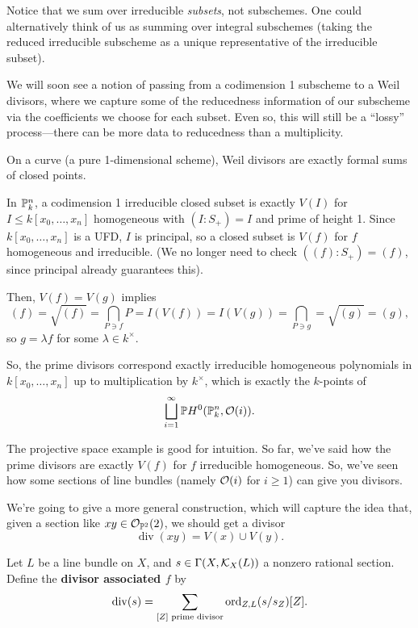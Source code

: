 \documentclass[12pt]{article}
\renewcommand{\div}{\operatorname{div}}
\begin{document}
Notice that we sum over irreducible \textit{subsets}, not subschemes. One could alternatively think of us as summing over integral subschemes (taking the reduced irreducible subscheme as a unique representative of the irreducible subset).

We will soon see a notion of passing from a codimension 1 subscheme to a Weil divisors, where we capture some of the reducedness information  of our subscheme via the coefficients we choose for each subset. Even so, this will still be a ``lossy'' process---there can be more data to reducedness than a multiplicity.

\begin{eg}
    On a curve (a pure 1-dimensional scheme), Weil divisors are exactly formal sums of closed points.
\end{eg}

\begin{eg}
    In $\P_k^n$, a codimension 1 irreducible closed subset is exactly $V(I)$ for $I\leq k[x_0,\dots,x_n]$ homogeneous with $(I:S_+)=I$ and prime of height 1. Since $k[x_0,\dots,x_n]$ is a UFD, $I$ is principal, so a closed subset is $V(f)$ for $f$ homogeneous and irreducible. (We no longer need to check $((f): S_+)=(f)$, since principal already guarantees this).

    Then, $V(f)=V(g)$ implies
    \[(f) = \sqrt{(f)} = \bigcap_{P\ni f} P = I(V(f)) = I(V(g)) = \bigcap_{P\ni g} = \sqrt{(g)} = (g),\]
    so $g=\lambda f$ for some $\lambda \in k^\times$.

    So, the prime divisors correspond exactly irreducible homogeneous polynomials in $k[x_0,\dots,x_n]$ up to multiplication by $k^\times$, which is exactly the $k$-points of
    \[\bigsqcup_{i=1}^\infty \P H^0(\P_k^n, \cO(i)).\]
\end{eg}

The projective space example is good for intuition. So far, we've said how the prime divisors are exactly $V(f)$ for $f$ irreducible homogeneous. So, we've seen how some sections of line bundles (namely $\cO(i)$ for $i\geq 1$) can give you divisors.

We're going to give a more general construction, which will capture the idea that, given a section like $xy \in \cO_{\P^2}(2)$, we should get a divisor
\[\div(xy) = V(x) \cup V(y).\]

\begin{defn}
    Let $L$ be a line bundle on $X$, and $s\in \Gamma(X,\cK_X(L))$ a nonzero rational section. Define the \textbf{divisor associated $f$} by
    \[\div(s) = \sum_{[Z] \text{ prime divisor}} \ord_{Z,L}(s/s_Z) [Z].\]
\end{defn}
\end{document}
